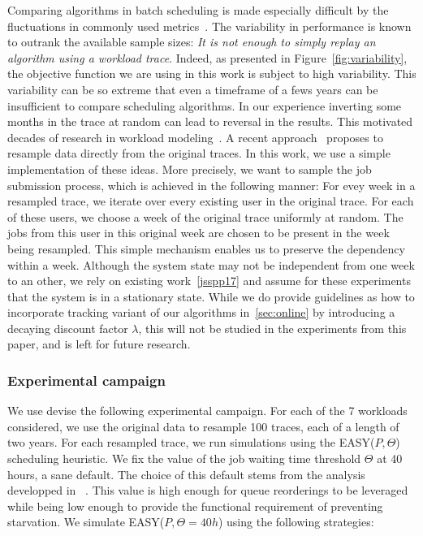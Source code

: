 \documentclass[sigconf,review,anonymous]{acmart}
\begin{document}
Comparing algorithms in batch scheduling is made especially difficult by the
fluctuations in commonly used metrics~\cite{jsm}. The variability in
performance is known to outrank the available sample sizes: \textit{It is not
enough to simply replay an algorithm using a workload trace}. Indeed, as
presented in Figure~\ref{fig:variability}, the objective function we are using
in this work is subject to high variability. This variability can be so extreme
that even a timeframe of a fews years can be insufficient to compare scheduling
algorithms. In our experience inverting some months in the trace at random can
lead to reversal in the results. This motivated decades of research in workload
modeling~\cite{feitbook}. A recent approach~\cite{feitresampling} proposes to
resample data directly from the original traces. In this work, we use a simple
implementation of these ideas.  More precisely, we want to sample the job
submission process, which is achieved in the following manner: For evey week in
a resampled trace, we iterate over every existing user in the original trace.
For each of these users, we choose a week of the original trace uniformly at
random. The jobs from this user in this original week are chosen to be present
in the week being resampled.  This simple mechanism enables us to preserve the
dependency within a week.  Although the system state may not be independent
from one week to an other, we rely on existing work~\ref{jsspp17} and assume
for these experiments that the system is in a stationary state. While we
do provide guidelines as how to incorporate tracking variant of our algorithms
in~\ref{sec:online} by introducing a decaying discount factor $\lambda$,
this will not be studied in the experiments from this paper, and is left for
future research.


\subsubsection{Experimental campaign}

We use devise the following experimental campaign. For each of the 7 workloads
considered, we use the original data to resample 100 traces, each of a length
of two years. For each resampled trace, we run simulations using the
EASY($P,\Theta$) scheduling heuristic. We fix the value of the job waiting time
threshold $\Theta$ at 40 hours, a sane default. The choice of this default
stems from the analysis developped in ~\cite{jsspp17}. This value is high
enough for queue reorderings to be leveraged while being low enough to provide
the functional requirement of preventing starvation. We simulate
EASY($P,\Theta=40h$) using the following strategies:
\end{document}
